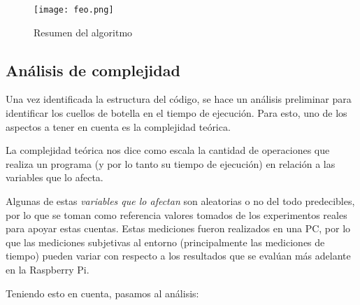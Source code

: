 \documentclass{article}
\begin{document}
\begin{figure*}[h]
    \centering
    \texttt{[image: feo.png]}
    \caption{Resumen del algoritmo}
    \label{label_diagrama_feo}
\end{figure*}

\newpage
\subsection{Análisis de complejidad}

Una vez identificada la estructura del código, se hace un análisis preliminar para identificar los cuellos de botella en el tiempo de ejecución. Para esto, uno de los aspectos a tener en cuenta es la complejidad teórica.

La complejidad teórica nos dice como escala la cantidad de operaciones que realiza un programa (y por lo tanto su tiempo de ejecución) en relación a las variables que lo afecta.

Algunas de estas \emph{variables que lo afectan} son aleatorias o no del todo predecibles, por lo que se toman como referencia valores tomados de los experimentos reales para apoyar estas cuentas. Estas mediciones fueron realizados en una PC, por lo que las mediciones subjetivas al entorno (principalmente las mediciones de tiempo) pueden variar con respecto a los resultados que se evalúan más adelante en la Raspberry Pi.

Teniendo esto en cuenta, pasamos al análisis:
\end{document}
